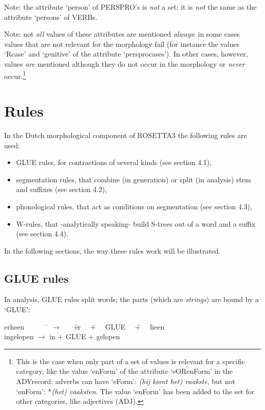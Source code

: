 Note: the attribute `person' of PERSPRO's is {\em not} a set; it is 
      {\em not} the same as the attribute `persons' of VERBs.

Note: not {\em all} values of these attributes are mentioned {\em always}: in
      some cases values that are not relevant for the morphology fail (for 
      instance the values `Rcase' and `genitive' of the attribute 
      `persprocases'). In other cases, however, values {\em are} mentioned
      although they do not occur in the morphology or {\em never} 
      occur.\footnote{This is the case when only part of a set of values is
      relevant for a specific category,
      like the value `enForm' of the attribute `eORenForm' in the ADVrecord:
      adverbs can have `eForm': {\em (hij komt het) vaakste}, but not `enForm':
      *{\em (het) vaaksten}. The value `enForm' has been added to the set 
      for other categories, like adjectives (ADJ).}

\newpage

\section{Rules}

In the Dutch morphological component of ROSETTA3 the following rules are 
used:

\begin{itemize}
  \item GLUE rules, for contractions of several kinds (see section 4.1),
  \item segmentation rules, that combine (in generation) or split (in analysis) 
        stem and suffixes (see section 4.2),
  \item phonological rules, that act as conditions on segmentation (see 
        section 4.3),
  \item W-rules, that -analytically speaking- build S-trees out of a 
        word and a suffix (see section 4.4).
\end{itemize}

In the following sections, the way these rules work will be illustrated.

\subsection{GLUE rules}

In analysis, GLUE rules split words; the parts (which are {\em strings}) 
are bound by a `GLUE':

\begin{tabbing}
erheen \ \ \ \ \ \  \= $\longrightarrow$ \ \ \  \= er \ \  \= + \ \  \= GLUE \ \  
\= + \ \  \= heen    \\
ingelopen    \> $\longrightarrow$ \> in \> + \> GLUE \> + \> gelopen   \\
\end{tabbing}

